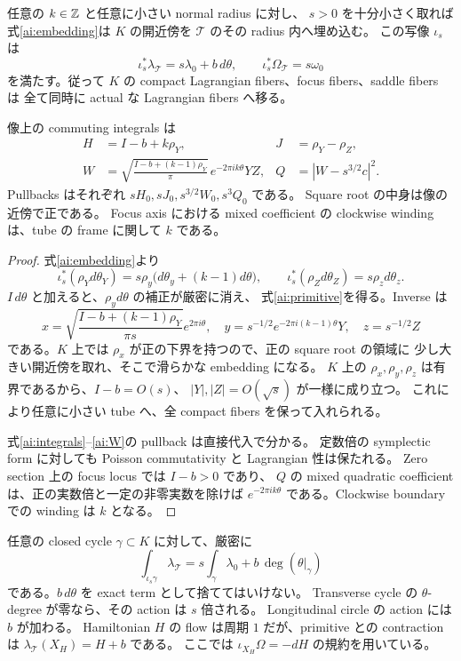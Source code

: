 \begin{theorem}\label{ai:insertion}
任意の $k\in\mathbb Z$ と任意に小さい normal radius に対し、
$s>0$ を十分小さく取れば式\eqref{ai:embedding}は $K$ の開近傍を
$\mathcal T$ のその radius 内へ埋め込む。
この写像 $\iota_s$ は
\begin{equation}\label{ai:primitive}
 \iota_s^*\lambda_{\mathcal T}=s\lambda_0+b\,d\theta,
 \qquad \iota_s^*\Omega_{\mathcal T}=s\omega_0
\end{equation}
を満たす。従って $K$ の compact Lagrangian fibers、focus fibers、saddle fibers は
全て同時に actual な Lagrangian fibers へ移る。

像上の commuting integrals は
\begin{align}
 H&=I-b+k\rho_Y,& J&=\rho_Y-\rho_Z,\label{ai:integrals}\\
 W&=\sqrt{\frac{I-b+(k-1)\rho_Y}{\pi}}\,
       e^{-2\pi ik\theta}YZ,& Q&=|W-s^{3/2}c|^2.\label{ai:W}
\end{align}
Pullbacks はそれぞれ $sH_0,sJ_0,s^{3/2}W_0,s^3Q_0$ である。
Square root の中身は像の近傍で正である。
Focus axis における mixed coefficient の clockwise winding は、tube の frame に関して $k$ である。
\end{theorem}

\begin{proof}
式\eqref{ai:embedding}より
\[
 \iota_s^*(\rho_Yd\theta_Y)
 =s\rho_y\bigl(d\theta_y+(k-1)d\theta\bigr),
 \qquad \iota_s^*(\rho_Zd\theta_Z)=s\rho_zd\theta_z.
\]
$I\,d\theta$ と加えると、$\rho_y d\theta$ の補正が厳密に消え、
式\eqref{ai:primitive}を得る。Inverse は
\[
 x=\sqrt{\frac{I-b+(k-1)\rho_Y}{\pi s}}e^{2\pi i\theta},\quad
 y=s^{-1/2}e^{-2\pi i(k-1)\theta}Y,\quad z=s^{-1/2}Z
\]
である。$K$ 上では $\rho_x$ が正の下界を持つので、正の square root の領域に
少し大きい開近傍を取れ、そこで滑らかな embedding になる。
$K$ 上の $\rho_x,\rho_y,\rho_z$ は有界であるから、$I-b=O(s)$、
$|Y|,|Z|=O(\sqrt s)$ が一様に成り立つ。
これにより任意に小さい tube へ、全 compact fibers を保って入れられる。

式\eqref{ai:integrals}--\eqref{ai:W}の pullback は直接代入で分かる。
定数倍の symplectic form に対しても Poisson commutativity と Lagrangian 性は保たれる。
Zero section 上の focus locus では $I-b>0$ であり、
$Q$ の mixed quadratic coefficient は、正の実数倍と一定の非零実数を除けば
$e^{-2\pi ik\theta}$ である。Clockwise boundary での winding は $k$ となる。
\end{proof}

\begin{remark}
任意の closed cycle $\gamma\subset K$ に対して、厳密に
\begin{equation}\label{ai:period}
 \int_{\iota_s\gamma}\lambda_{\mathcal T}
 =s\int_\gamma\lambda_0+b\,\deg(\theta|_\gamma)
\end{equation}
である。$b\,d\theta$ を exact term として捨ててはいけない。
Transverse cycle の $\theta$-degree が零なら、その action は $s$ 倍される。
Longitudinal circle の action には $b$ が加わる。
Hamiltonian $H$ の flow は周期 $1$ だが、primitive との contraction は
$\lambda_{\mathcal T}(X_H)=H+b$ である。
ここでは $\iota_{X_H}\Omega=-dH$ の規約を用いている。
\end{remark}

